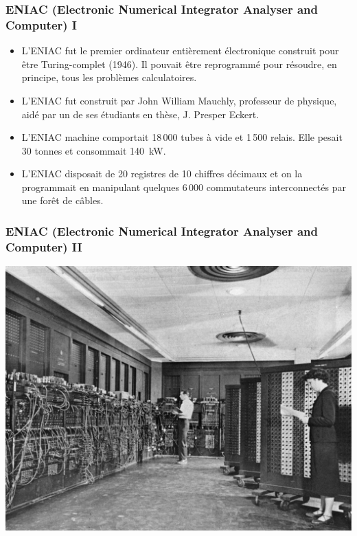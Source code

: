 \documentclass[utf8,10pt]{beamer}
\begin{document}
\begin{frame}
    \frametitle{ENIAC (Electronic Numerical Integrator Analyser and Computer) I}
    
    \begin{itemize}
        \item L'ENIAC fut le premier ordinateur entièrement électronique construit pour être Turing-complet
         (1946). 
        Il pouvait être reprogrammé pour résoudre, en principe, tous les problèmes calculatoires.
        
        \item L'ENIAC fut construit par John William Mauchly, professeur de physique, aidé par un de ses
        étudiants en thèse, J. Presper Eckert.
        
        \item L'ENIAC machine comportait 18\,000 tubes à vide et 1\,500 relais. Elle pesait 30 tonnes et 
        consommait 140~kW.
        
        \item L'ENIAC disposait de 20 registres de 10 \alert{chiffres décimaux} et on la programmait en manipulant
        quelques 6\,000 commutateurs interconnectés par une forêt de câbles. 
    \end{itemize}
    
    \hfill \hyperlink{http://fr.wikipedia.org/wiki/ENIAC}{}
\end{frame}


\begin{frame}
    \frametitle{ENIAC (Electronic Numerical Integrator Analyser and Computer) II}   
    \begin{center}
        \includegraphics[scale=0.2]{./images/Eniac}
    \end{center}
\end{frame}
\end{document}
